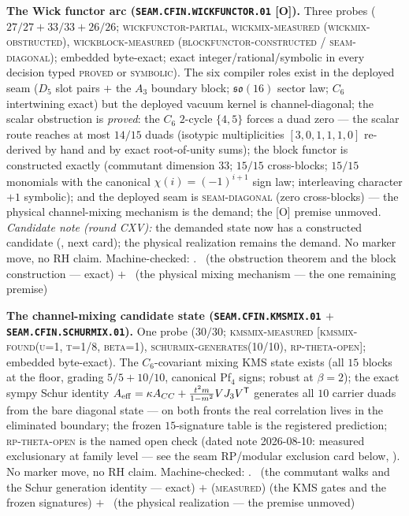 
\par\smallskip\noindent\textbf{The Wick functor arc
(\texttt{SEAM.CFIN.\allowbreak WICKFUNCTOR.01} [O]).}
Three probes ($27/27 + 33/33 + 26/26$;
\textsc{wickfunctor-partial}, \textsc{wickmix-measured
(wickmix-obstructed)}, \textsc{wickblock-measured
(blockfunctor-constructed / seam-diagonal)}; embedded
byte-exact; exact integer/rational/symbolic in every decision
typed \textsc{proved} or \textsc{symbolic}).  The six compiler
roles exist in the deployed seam ($D_5$ slot pairs $+$ the
$A_3$ boundary block; $\mathfrak{so}(16)$ sector law; $C_6$
intertwining exact) but the deployed vacuum kernel is
channel-diagonal; the scalar obstruction is \emph{proved}: the
$C_6$ $2$-cycle $\{4, 5\}$ forces a duad zero --- the scalar
route reaches at most $14/15$ duads (isotypic multiplicities
$[3,0,1,1,1,0]$ re-derived by hand and by exact root-of-unity
sums); the block functor is constructed exactly (commutant
dimension $33$; $15/15$ cross-blocks; $15/15$ monomials with
the canonical $\chi(i) = (-1)^{i+1}$ sign law; interleaving
character $+1$ symbolic); and the deployed seam is
\textsc{seam-diagonal} (zero cross-blocks) --- the physical
channel-mixing mechanism is the demand; the [O] premise
unmoved.  \emph{Candidate note (round CXV):} the demanded state
now has a constructed candidate
(, next card); the physical
realization remains the demand.  No marker move, no RH claim.
Machine-checked: .
\mE\ (the obstruction theorem and the block construction ---
exact) $+$ \mO\ (the physical mixing mechanism --- the one
remaining premise)
\par\smallskip

\par\smallskip\noindent\textbf{The channel-mixing candidate
state (\texttt{SEAM.CFIN.\allowbreak KMSMIX.01} $+$
\texttt{SEAM.CFIN.\allowbreak SCHURMIX.01}).}
One probe ($30/30$; \textsc{kmsmix-measured [kmsmix-found(u=1,
t=1/8, beta=1), schurmix-generates(10/10), rp-theta-open]};
embedded byte-exact).  The $C_6$-covariant mixing KMS state
exists (all $15$ blocks at the floor, grading $5/5 + 10/10$,
canonical Pf$_4$ signs; robust at $\beta = 2$); the exact sympy
Schur identity $A_{\rm eff} = \kappa A_{CC} + \tfrac{t^2
m}{1-m^2} V J_3 V^{\mathsf T}$ generates all $10$ carrier duads
from the bare diagonal state --- on both fronts the real
correlation lives in the eliminated boundary; the frozen
$15$-signature table is the registered prediction;
\textsc{rp-theta-open} is the named open check (dated note
2026-08-10: measured exclusionary at family level --- see the
seam RP/modular exclusion card below,
).  No marker move,
no RH claim.
Machine-checked: .
\mE\ (the commutant walks and the Schur generation identity ---
exact) $+$ (\textsc{measured}) (the KMS gates and the frozen
signatures) $+$ \mO\ (the physical realization --- the premise
unmoved)
\par\smallskip

